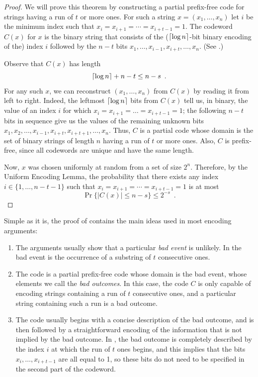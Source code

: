 \documentclass[prodmode,acmcsur]{acmsmall}
\begin{document}
\begin{proof}
  We will prove this theorem by constructing a partial prefix-free
  code for strings having a run of $t$ or more ones.  For such a
  string $x=(x_1,\ldots,x_n)$ let $i$ be the minimum index such that
  $x_i=x_{i+1}=\cdots=x_{i+t-1}=1$. The codeword $C(x)$ for $x$ is the
  binary string that consists of the (${\lceil \log n \rceil}$-bit binary
  encoding of the) index $i$ followed by the $n-t$ bits
  $x_1,\ldots,x_{i-1},x_{i+t},\ldots,x_n$. (See .)

  Observe that $C(x)$ has length 
  \[
    {\lceil \log n \rceil} + n - t \le n-s \enspace .
  \]
   For any
  such $x$, we can reconstruct $(x_1,\ldots,x_n)$ from $C(x)$ by
  reading it from left to right. Indeed, the leftmost ${\lceil \log n \rceil}$
  bits from $C(x)$ tell us, in binary, the value of an index $i$ for
  which $x_i = x_{i + 1} = \dots = x_{i + t - 1} = 1$; the following
  $n - t$ bits in sequence give us the values of the remaining unknown
  bits
  $x_1, x_2, \dots, x_{i - 1}, x_{i + t}, x_{i + t + 1}, \dots,
  x_n$. Thus, $C$ is a partial code whose domain is the set of binary
  strings of length $n$ having a run of $t$ or more ones.  Also,
  $C$ is prefix-free, since all codewords are unique and have the same length.

  Now, $x$ was chosen uniformly at random from a set of size $2^{n}$.
  Therefore, by the Uniform Encoding Lemma, the probability that there
  exists any index $i\in\{1,\ldots,n-t-1\}$ such that
  $x_i=x_{i+1}=\cdots=x_{i+t-1}=1$ is at most
  \[
    \Pr\{|C(x)|\le n-s\} \le 2^{-s} \enspace . %
  \]
\end{proof}

Simple as it is, the proof of  contains the main ideas
used in most encoding arguments: 
\begin{enumerate}
\item The arguments usually show that a particular \emph{bad event} is
  unlikely. In  the bad event is the occurrence of a
  substring of $t$ consecutive ones.

\item The code is a partial prefix-free code whose domain is the bad
  event, whose elements we call the \emph{bad outcomes}. In this case, the code
  $C$ is only capable of encoding strings containing a run of $t$
  consecutive ones, and a particular string containing such a run is a
  bad outcome.

\item The code usually begins with a concise description of the bad
  outcome, and is then followed by a straightforward encoding of the
  information that is not implied by the bad outcome. In
  , the bad outcome is completely described by the index
  $i$ at which the run of $t$ ones begins, and this implies that
  the bits $x_i,\ldots,x_{i+t-1}$ are all equal to 1, so these bits do
  not need to be specified in the second part of the codeword.
\end{enumerate}
\end{document}
